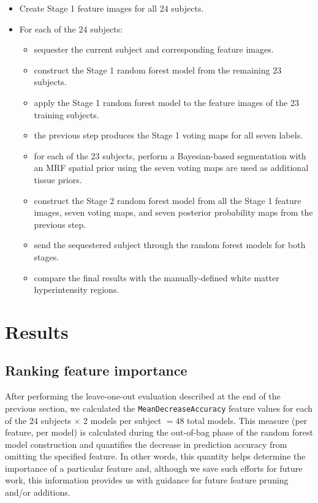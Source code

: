 \documentclass[11pt,]{article}
\providecommand{\tightlist}{%
  \setlength{\itemsep}{0pt}\setlength{\parskip}{0pt}}
\begin{document}
\begin{itemize}
\tightlist
\item
  Create Stage 1 feature images for all 24 subjects.
\item
  For each of the 24 subjects:

  \begin{itemize}
  \tightlist
  \item
    sequester the current subject and corresponding feature images.
  \item
    construct the Stage 1 random forest model from the remaining 23
    subjects.
  \item
    apply the Stage 1 random forest model to the feature images of the
    23 training subjects.
  \item
    the previous step produces the Stage 1 voting maps for all seven
    labels.
  \item
    for each of the 23 subjects, perform a Bayesian-based segmentation
    with an MRF spatial prior using the seven voting maps are used as
    additional tissue priors.
  \item
    construct the Stage 2 random forest model from all the Stage 1
    feature images, seven voting maps, and seven posterior probability
    maps from the previous step.
  \item
    send the sequestered subject through the random forest models for
    both stages.
  \item
    compare the final results with the manually-defined white matter
    hyperintensity regions.
  \end{itemize}
\end{itemize}

\section{Results}\label{results}

\subsection{Ranking feature
importance}\label{ranking-feature-importance}

After performing the leave-one-out evaluation described at the end of
the previous section, we calculated the \texttt{MeanDecreaseAccuracy}
feature values for each of the 24 subjects \(\times\) 2 models per
subject \(=48\) total models. This measure (per feature, per model) is
calculated during the out-of-bag phase of the random forest model
construction and quantifies the decrease in prediction accuracy from
omitting the specified feature. In other words, this quantity helps
determine the importance of a particular feature and, although we save
such efforts for future work, this information provides us with guidance
for future feature pruning and/or additions.
\end{document}

